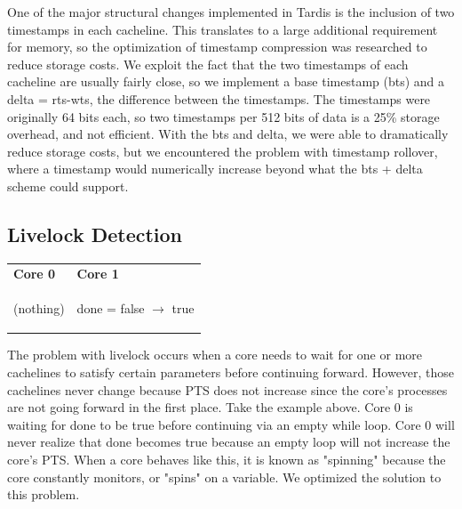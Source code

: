\documentclass[12pt]{article}
\begin{document}
One of the major structural changes implemented in Tardis is the inclusion of two timestamps in each cacheline. This translates to a large additional requirement for memory, so the optimization of timestamp compression was researched to reduce storage costs. We exploit the fact that the two timestamps of each cacheline are usually fairly close, so we implement a base timestamp (bts) and a delta = rts-wts, the difference between the timestamps. The timestamps were originally 64 bits each, so two timestamps per 512 bits of data is a 25\% storage overhead, and not efficient.  With the bts and delta, we were able to dramatically reduce storage costs, but we encountered the problem with timestamp rollover, where a timestamp would numerically increase beyond what the bts + delta scheme could support.


\subsection{Livelock Detection} \label{sec:livelock-detection}

\begin{center}
	
	\begin{tabular}{p{5cm} p{5cm}}
		\textbf{Core 0} & \textbf{Core 1} \\
		\begin{algorithm}[H]
			\While{!done}
			{(nothing)}
			
		\end{algorithm}
		&
		\begin{algorithm}[H]
			done = false $\rightarrow$  true
		\end{algorithm}
		\\
	\end{tabular}
	
\end{center}

The problem with livelock occurs when a core needs to wait for one or more cachelines to satisfy certain parameters before continuing forward. However, those cachelines never change because PTS does not increase since the core’s processes are not going forward in the first place. Take  the example above. Core 0 is waiting for done to be true before continuing via an empty while loop. Core 0 will never realize that done becomes true because an empty loop will not increase the core’s PTS. When a core behaves like this, it is known as "spinning" because the core constantly monitors, or "spins" on a variable. We optimized the solution to this problem. 
\end{document}
